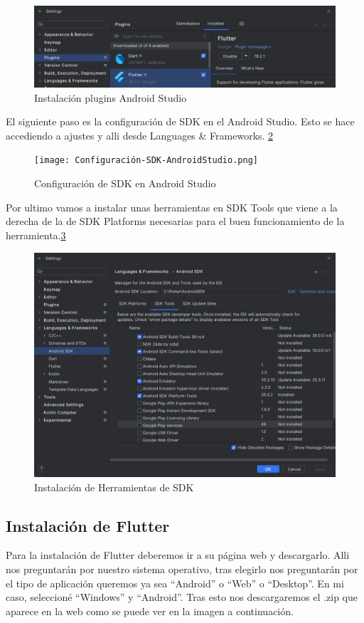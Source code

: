 \begin{figure}[H]
    \centering
    \includegraphics[width=0.8\linewidth]{PlugingsAndroidStudio.png}
    \caption{Instalación plugins Android Studio}
    \label{C4}
\end{figure}


El siguiente paso es la configuración de SDK en el Android Studio. Esto se hace accediendo a ajustes y alli desde Languages \& Frameworks. \ref{C5}

\begin{figure}[H]
    \centering
    \texttt{[image: Configuración-SDK-AndroidStudio.png]}
    \caption{Configuración de SDK en Android Studio}
    \label{C5}
\end{figure}


Por ultimo vamos a instalar unas herramientas en SDK Tools que viene a la derecha de la de SDK Platforms necesarias para el buen funcionamiento de la herramienta.\ref{C6}

\begin{figure}[H]
    \centering
    \includegraphics[width=0.8\linewidth]{Configuracion-SDKTools-AndroidStudio.png}
    \caption{Instalación de Herramientas de SDK}
    \label{C6}
\end{figure}

\subsection{\textbf{Instalación de Flutter}}
Para la instalación de Flutter deberemos ir a su página web y descargarlo. Alli nos preguntarán por nuestro sistema operativo, tras elegirlo nos preguntarán por el tipo de aplicación queremos ya sea ``Android'' o ``Web'' o ``Desktop''. En mi caso, seleccioné ``Windows'' y ``Android''. Tras esto nos descargaremos el .zip que aparece en la web como se puede ver en la imagen a continuación.

